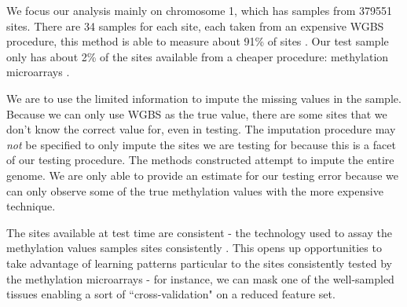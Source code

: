 \documentclass{article} %
\begin{document}
We focus our analysis mainly on chromosome 1, which has samples from 379551 sites. There are 34 samples for each site, each taken from an expensive WGBS procedure, this method is able to measure about 91\% of sites \cite{laird2010principles}. Our test sample only has about 2\% of the sites available from a cheaper procedure: methylation microarrays \cite{zhang2015predicting}.

We are to use the limited information to impute the missing values in the sample. Because we can only use WGBS as the true value, there are some sites that we don't know the correct value for, even in testing. The imputation procedure may {\em not} be specified to only impute the sites we are testing for because this is a facet of our testing procedure. The methods constructed attempt to impute the entire genome. We are only able to provide an estimate for our testing error because we can only observe some of the true methylation values with the more expensive technique.

The sites available at test time are consistent - the technology used to assay the methylation values samples sites consistently \cite{infinium}. This opens up opportunities to take advantage of learning patterns particular to the sites consistently tested by the methylation microarrays - for instance, we can mask one of the well-sampled tissues enabling a sort of ``cross-validation" on a reduced feature set.
\end{document}
